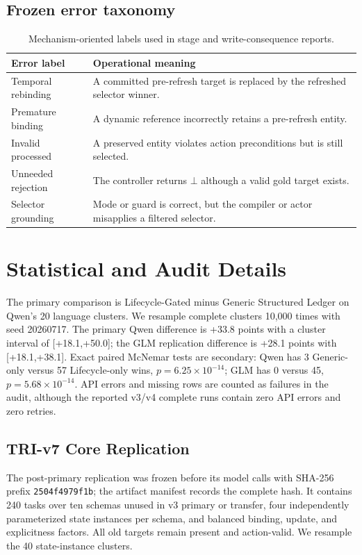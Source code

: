 \documentclass[10pt]{article}
\begin{document}
\subsection{Frozen error taxonomy}
\begin{table}[h]
\centering
\small
\setlength{\tabcolsep}{4pt}
\begin{tabular}{p{}p{}}
\toprule
Error label & Operational meaning \\
\midrule
Temporal rebinding & A committed pre-refresh target is replaced by the refreshed selector winner. \\
Premature binding & A dynamic reference incorrectly retains a pre-refresh entity. \\
Invalid processed & A preserved entity violates action preconditions but is still selected. \\
Unneeded rejection & The controller returns $\bot$ although a valid gold target exists. \\
Selector grounding & Mode or guard is correct, but the compiler or actor misapplies a filtered selector. \\
\bottomrule
\end{tabular}
\caption{Mechanism-oriented labels used in stage and write-consequence reports.}
\label{tab:supp-errors}
\end{table}

\section{Statistical and Audit Details}
The primary comparison is Lifecycle-Gated minus Generic Structured Ledger on Qwen's 20
language clusters. We resample complete clusters 10,000 times with seed 20260717. The
primary Qwen difference is +33.8 points with a cluster interval of [+18.1,+50.0]; the GLM
replication difference is +28.1 points with [+18.1,+38.1]. Exact paired McNemar tests are
secondary: Qwen has 3 Generic-only versus 57 Lifecycle-only wins, $p=6.25\times10^{-14}$;
GLM has 0 versus 45, $p=5.68\times10^{-14}$. API errors and missing rows are counted as
failures in the audit, although the reported v3/v4 complete runs contain zero API errors
and zero retries.

\subsection{TRI-v7 Core Replication}
The post-primary replication was frozen before its model calls with SHA-256 prefix
\texttt{2504f4979f1b}; the artifact manifest records the complete hash.
It contains 240 tasks over ten schemas unused in v3 primary or transfer, four independently
parameterized state instances per schema, and balanced binding, update, and explicitness factors.
All old targets remain present and action-valid. We resample the 40 state-instance clusters.
\end{document}
